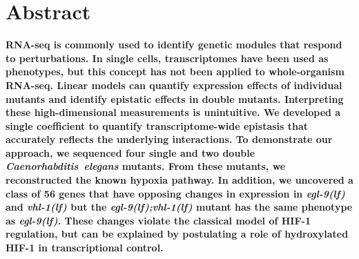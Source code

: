 \documentclass[10pt, onecolumn]{article}
\newcommand{\egl}{\emph{\mbox{egl-9}(lf)}}
\newcommand{\vhl}{\emph{\mbox{vhl-1}(lf)}}
\newcommand{\eglvhl}{\emph{\mbox{egl-9(lf);vhl-1(lf)}}}
\newcommand{\eglp}{EGL-9}
\newcommand{\vhlp}{VHL-1}
\newcommand{\hifp}{HIF-1}
\newcommand{\hifohtargets}{56}
\begin{document}
\section*{Abstract}
\textbf{RNA-seq is commonly used to identify genetic modules that respond to perturbations.
In single cells, transcriptomes have been used as phenotypes, but this concept has
not been applied to whole-organism RNA-seq. Linear models can quantify expression
effects of individual mutants and identify epistatic effects in double mutants.
Interpreting these high-dimensional measurements is unintuitive. We developed a
single coefficient to quantify transcriptome-wide epistasis that accurately
reflects the underlying interactions. To demonstrate our approach, we sequenced
four single and two double \emph{Caenorhabditis~elegans} mutants. From these
mutants, we reconstructed the known hypoxia pathway. In addition, we uncovered a
class of \hifohtargets{} genes that have opposing changes in expression in \egl{}
and \vhl{} but the \eglvhl{} mutant has the same phenotype as \egl{}. These
changes violate the classical model of HIF-1 regulation, but can be explained by
postulating a role of hydroxylated HIF-1 in transcriptional control.
}
\vspace{10mm}
\end{document}

